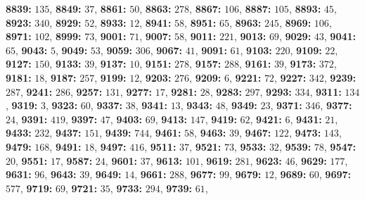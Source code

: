 \textsf{\bfseries 8839:} $135$, \textsf{\bfseries 8849:} $37$, \textsf{\bfseries 8861:} $50$, \textsf{\bfseries 8863:} $278$, \textsf{\bfseries 8867:} $106$, \textsf{\bfseries 8887:} $105$, \textsf{\bfseries 8893:} $45$, \textsf{\bfseries 8923:} $340$, \textsf{\bfseries 8929:} $52$, \textsf{\bfseries 8933:} $12$, \textsf{\bfseries 8941:} $58$, \textsf{\bfseries 8951:} $65$, \textsf{\bfseries 8963:} $245$, \textsf{\bfseries 8969:} $106$, \textsf{\bfseries 8971:} $102$, \textsf{\bfseries 8999:} $73$, \textsf{\bfseries 9001:} $71$, \textsf{\bfseries 9007:} $58$, \textsf{\bfseries 9011:} $221$, \textsf{\bfseries 9013:} $69$, \textsf{\bfseries 9029:} $43$, \textsf{\bfseries 9041:} $65$, \textsf{\bfseries 9043:} $5$, \textsf{\bfseries 9049:} $53$, \textsf{\bfseries 9059:} $306$, \textsf{\bfseries 9067:} $41$, \textsf{\bfseries 9091:} $61$, \textsf{\bfseries 9103:} $220$, \textsf{\bfseries 9109:} $22$, \textsf{\bfseries 9127:} $150$, \textsf{\bfseries 9133:} $39$, \textsf{\bfseries 9137:} $10$, \textsf{\bfseries 9151:} $278$, \textsf{\bfseries 9157:} $288$, \textsf{\bfseries 9161:} $39$, \textsf{\bfseries 9173:} $372$, \textsf{\bfseries 9181:} $18$, \textsf{\bfseries 9187:} $257$, \textsf{\bfseries 9199:} $12$, \textsf{\bfseries 9203:} $276$, \textsf{\bfseries 9209:} $6$, \textsf{\bfseries 9221:} $72$, \textsf{\bfseries 9227:} $342$, \textsf{\bfseries 9239:} $287$, \textsf{\bfseries 9241:} $286$, \textsf{\bfseries 9257:} $131$, \textsf{\bfseries 9277:} $17$, \textsf{\bfseries 9281:} $28$, \textsf{\bfseries 9283:} $297$, \textsf{\bfseries 9293:} $334$, \textsf{\bfseries 9311:} $134$, \textsf{\bfseries 9319:} $3$, \textsf{\bfseries 9323:} $60$, \textsf{\bfseries 9337:} $38$, \textsf{\bfseries 9341:} $13$, \textsf{\bfseries 9343:} $48$, \textsf{\bfseries 9349:} $23$, \textsf{\bfseries 9371:} $346$, \textsf{\bfseries 9377:} $24$, \textsf{\bfseries 9391:} $419$, \textsf{\bfseries 9397:} $47$, \textsf{\bfseries 9403:} $69$, \textsf{\bfseries 9413:} $147$, \textsf{\bfseries 9419:} $62$, \textsf{\bfseries 9421:} $6$, \textsf{\bfseries 9431:} $21$, \textsf{\bfseries 9433:} $232$, \textsf{\bfseries 9437:} $151$, \textsf{\bfseries 9439:} $744$, \textsf{\bfseries 9461:} $58$, \textsf{\bfseries 9463:} $39$, \textsf{\bfseries 9467:} $122$, \textsf{\bfseries 9473:} $143$, \textsf{\bfseries 9479:} $168$, \textsf{\bfseries 9491:} $18$, \textsf{\bfseries 9497:} $416$, \textsf{\bfseries 9511:} $37$, \textsf{\bfseries 9521:} $73$, \textsf{\bfseries 9533:} $32$, \textsf{\bfseries 9539:} $78$, \textsf{\bfseries 9547:} $20$, \textsf{\bfseries 9551:} $17$, \textsf{\bfseries 9587:} $24$, \textsf{\bfseries 9601:} $37$, \textsf{\bfseries 9613:} $101$, \textsf{\bfseries 9619:} $281$, \textsf{\bfseries 9623:} $46$, \textsf{\bfseries 9629:} $177$, \textsf{\bfseries 9631:} $96$, \textsf{\bfseries 9643:} $39$, \textsf{\bfseries 9649:} $14$, \textsf{\bfseries 9661:} $288$, \textsf{\bfseries 9677:} $99$, \textsf{\bfseries 9679:} $12$, \textsf{\bfseries 9689:} $60$, \textsf{\bfseries 9697:} $577$, \textsf{\bfseries 9719:} $69$, \textsf{\bfseries 9721:} $35$, \textsf{\bfseries 9733:} $294$, \textsf{\bfseries 9739:} $61$, 
